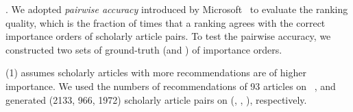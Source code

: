 
.
We adopted {\em pairwise accuracy} introduced by Microsoft~\cite{Richardson06:BPR,wsdmcup} to evaluate the ranking quality, which is the fraction of times that a ranking agrees with the correct importance orders of scholarly article pairs.
%
To test the pairwise accuracy, we constructed two sets of ground-truth (\recom and \fcita) of importance orders.

\noindent
(1) \recom assumes scholarly articles with more recommendations are of higher importance.
We used the numbers of recommendations of 93 articles on \aan~\cite{Liang16AAAI}, %
and %
generated (2133, 966, 1972) scholarly article pairs on (\aan, \aminer, \magdata), respectively.


